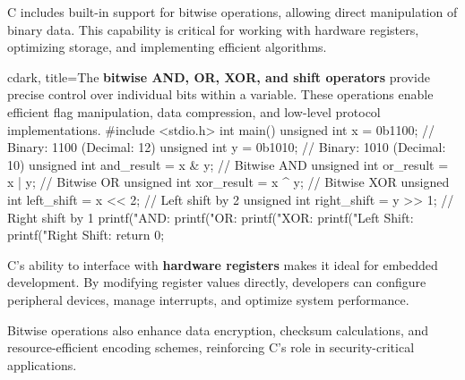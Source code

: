\begin{NxSSSSBox}
	\begin{NxIDBox}
		C includes built-in support for bitwise operations, allowing direct manipulation of binary data. This capability is critical for working with hardware registers, optimizing storage, and implementing efficient algorithms.
	\end{NxIDBox}
	\begin{NxCodeBox}{c}{dark, title={The \textbf{bitwise AND, OR, XOR, and shift operators} provide precise control over individual bits within a variable. These operations enable efficient flag manipulation, data compression, and low-level protocol implementations.}}
		#include <stdio.h>
		int main() {
			unsigned int x = 0b1100;  // Binary: 1100 (Decimal: 12)
			unsigned int y = 0b1010;  // Binary: 1010 (Decimal: 10)
			unsigned int and_result = x & y;  // Bitwise AND
			unsigned int or_result  = x | y;  // Bitwise OR
			unsigned int xor_result = x ^ y;  // Bitwise XOR
			unsigned int left_shift = x << 2; // Left shift by 2
			unsigned int right_shift = y >> 1; // Right shift by 1
			printf("AND: %
			printf("OR: %
			printf("XOR: %
			printf("Left Shift: %
			printf("Right Shift: %
			return 0;
		}
	\end{NxCodeBox}
	\begin{NxIDBox}
		C's ability to interface with \textbf{hardware registers} makes it ideal for embedded development. By modifying register values directly, developers can configure peripheral devices, manage interrupts, and optimize system performance.
	\end{NxIDBox}
	\begin{NxIDBox}
		Bitwise operations also enhance data encryption, checksum calculations, and resource-efficient encoding schemes, reinforcing C’s role in security-critical applications.
	\end{NxIDBox}
\end{NxSSSSBox}

